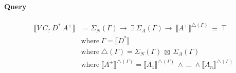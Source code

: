 \paragraph{Query}
\begin{align*}
\llbracket V~C_?~D^*~A^+ \rrbracket &= \Sigma_N(\Gamma)\rightarrow~\exists~\Sigma_A(\Gamma)\rightarrow~\llbracket A^+ \rrbracket^{\triangle(\Gamma)}~\equiv~\top\\
     &\text{where}~\Gamma =\llbracket D^* \rrbracket \\
     &\text{where}~\triangle(\Gamma) = \Sigma_N(\Gamma)~\boxtimes~\Sigma_A(\Gamma) \\
     &\text{where}~\llbracket A^+ \rrbracket^{\triangle(\Gamma)} = \llbracket A_1 \rrbracket^{\triangle(\Gamma)}~\land~...~\land\llbracket A_n \rrbracket^{\triangle(\Gamma)} \tag{Query}
\end{align*}